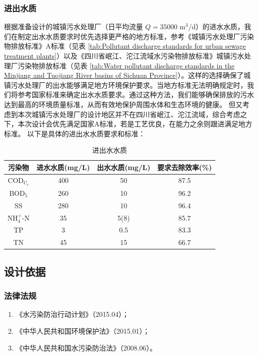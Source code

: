 \subsubsection{进出水质}
根据准备设计的城镇污水处理厂（日平均流量 $Q=35000$ m$^3$/d）的进水水质，我们在制定出水水质要求时优先选择更严格的地方标准，参考《城镇污水处理厂污染物排放标准》A标准（见表 \ref{tab:Pollutant discharge standards for urban sewage treatment plants}）以及《四川省岷江、沱江流域水污染物排放标准》城镇污水处理厂污染物排放标准（见表 \ref{tab:Water pollutant discharge standards in the Minjiang and Tuojiang River basins of Sichuan Province}）。这样的选择确保了城镇污水处理厂的出水能够满足地方环境保护要求。当地方标准无法明确规定时，我们将参考国家标准来确定出水水质要求。通过这种方法，我们能够确保排放的污水达到最高的环境质量标准，从而有效地保护周围水体和生态环境的健康。
但又考虑到本次城镇污水处理厂的设计地区并不在四川省岷江、沱江流域，综合考虑之下，本次设计会优先满足国家A标准，若是工艺优良，在能力之余则跟进满足地方标准。
以下是具体的进出水水质要求和标准：

\begin{table}[H]
	\centering
	\caption{进出水水质}
	\begin{tabular}{cccc}
		\toprule
		污染物   & 进水水质(mg/L) & 出水水质(mg/L) & 要求去除效率(\%) \\
		\midrule
		COD$\mathrm{_{C_r}}$ & 400   & 50    & 87.5  \\
		BOD$_5$  & 260   & 10     & 96.2 \\
		SS    & 280   & 10    & 96.4  \\
		NH$_4^+$-N\footnotemark & 35    & 5(8) & 85.7  \\
		TP    & 3     & 0.5   & 83.3  \\
		TN    & 45    & 15    & 66.7  \\
		\bottomrule
	\end{tabular}%
	\label{tab:in water}%
\end{table}%

\subsection{设计依据}
\subsubsection{法律法规}
\begin{enumerate}
	\item 《水污染防治行动计划》（2015.04）；
	\item 《中华人民共和国环境保护法》（2015.01）；
	\item 《中华人民共和国水污染防治法》（2008.06）。
\end{enumerate}

